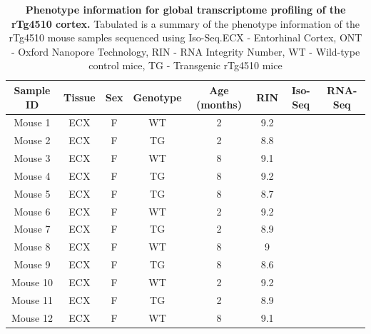 \vspace{1cm}
\begin{table}[h]
	\captionsetup{width=0.95\textwidth}
	\caption[Phenotype information for global transcriptome profiling of the rTg4510 cortex]%
	{\textbf{Phenotype information for global transcriptome profiling of the rTg4510 cortex.} Tabulated is a summary of the phenotype information of the rTg4510 mouse samples sequenced using Iso-Seq.\newline ECX - Entorhinal Cortex, ONT - Oxford Nanopore Technology, RIN - RNA Integrity Number, WT - Wild-type control mice, TG - Transgenic rTg4510 mice}
	\label{tab:whole_phenotype}
	\centering
	\begin{tabular}{@{}cccccccc@{}}
		\toprule
		Sample ID & Tissue & Sex & Genotype & Age (months) & RIN & Iso-Seq & RNA-Seq  \\ \midrule
		Mouse 1   & ECX    & F   & WT       & 2         & 9.2 & \checkmark       &  \checkmark         \\
		Mouse 2   & ECX    & F   & TG       & 2         & 8.8 & \checkmark        & \checkmark        \\
		Mouse 3   & ECX    & F   & WT       & 8         & 9.1 & \checkmark        & \checkmark        \\
		Mouse 4   & ECX    & F   & TG       & 8         & 9.2 & \checkmark        & \checkmark        \\
		Mouse 5   & ECX    & F   & TG       & 8         & 8.7 & \checkmark        & \checkmark        \\
		Mouse 6   & ECX    & F   & WT       & 2         & 9.2 & \checkmark        & \checkmark        \\
		Mouse 7   & ECX    & F   & TG       & 2         & 8.9 & \checkmark        & \checkmark        \\
		Mouse 8   & ECX    & F   & WT       & 8         & 9   & \checkmark        & \checkmark       \\
		Mouse 9   & ECX    & F   & TG       & 8         & 8.6 & \checkmark        & \checkmark        \\
		Mouse 10  & ECX    & F   & WT       & 2         & 9.2 & \checkmark        & \checkmark        \\
		Mouse 11  & ECX    & F   & TG       & 2         & 8.9 & \checkmark        & \checkmark       \\
		Mouse 12  & ECX    & F   & WT       & 8         & 9.1 & \checkmark        & \checkmark        \\ \bottomrule
	\end{tabular}
\end{table}

